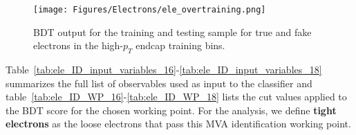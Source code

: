 \begin{figure}[!htb]
\vspace*{0.3cm}
\begin{center}
\texttt{[image: Figures/Electrons/ele\_overtraining.png]}
\caption{BDT output for the training and testing sample for true and fake electrons in the high-$p_T$ endcap training bins.
\label{fig:ele_ID_BDT_output}}
\end{center}
\end{figure}

Table~\ref{tab:ele_ID_input_variables_16}-\ref{tab:ele_ID_input_variables_18} summarizes the full list of observables used as input to the classifier
and table~\ref{tab:ele_ID_WP_16}-\ref{tab:ele_ID_WP_18} lists the cut values applied to the BDT score for the chosen working point. 
For the analysis, we define {\bf tight electrons} as the loose electrons that pass this MVA identification working point. 


